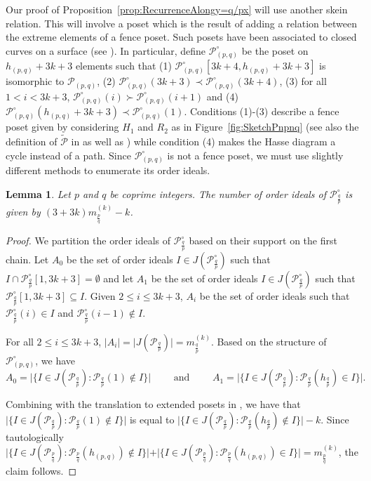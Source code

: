 \documentclass{article}
\newtheorem{lemma}[theorem]{Lemma}
\theoremstyle{remark}
\newcommand{\fqp}{\frac{q}{p}}
\newcommand{\calP}{\mathcal{P}}
\begin{document}
Our proof of Proposition~\ref{prop:RecurrenceAlongy=q/px} will use another skein relation. This will involve a poset which is the result of adding a relation between the extreme elements of a fence poset. Such posets have been associated to closed curves on a surface (see \cite[Theorem 5.7]{musiker2013bases}). In particular, define $\calP^\circ_{(p,q)}$ be the poset on $h_{(p,q)} + 3k + 3$ elements such that (1) $\calP^\circ_{(p,q)}[3k+4,h_{(p,q)}+3k+3]$ is isomorphic to $\calP_{(p,q)}$, (2) $\calP^\circ_{(p,q)}(3k+3) \prec \calP^\circ_{(p,q)}(3k+4)$, (3) for all $1 < i <  3k+3$, $\calP^\circ_{(p,q)}(i) \succ \calP^\circ_{(p,q)}(i+1)$ and (4) $\calP^\circ_{(p,q)}(h_{(p,q)}+3k+3) \prec \calP^\circ_{(p,q)}(1)$. Conditions (1)-(3) describe a fence poset given by considering $H_1$ and $R_2$ as in Figure~\ref{fig:SketchPnpnq} (see also the definition of $\widetilde{\calP}$ in \cite{BG} as well as \cite[Section 7]{ouguz2025oriented}) while condition (4) makes the Hasse diagram a cycle instead of a path. Since $\calP^\circ_{(p,q)}$ is not a fence poset, we must use slightly different methods to enumerate its order ideals. 

\begin{lemma}\label{lem:NumberOfOrderIdealsCircular}
Let $p$ and $q$ be coprime integers. The number of order ideals of $\calP^\circ_\fqp$ is given by $(3+3k)m_{\frac{p}{q}}^{(k)} - k$.
\end{lemma}

\begin{proof}
We partition the order ideals of $\calP^\circ_\fqp$ based on their support on the first chain.  Let $A_0$ be the set of order ideals $I \in J(\calP^\circ_\fqp)$ such that $I \cap\calP^\circ_\fqp[1, 3k + 3] = \emptyset$ and let $A_1$ be the set of order ideals $I \in J(\calP^\circ_\fqp)$ such that $\calP^\circ_\fqp[1, 3k + 3] \subseteq I$. Given $2 \leq i \leq 3k+3$, $A_i$ be the set of order ideals such that $\calP^\circ_\fqp(i) \in I$ and  $\calP^\circ_\fqp(i-1) \notin I$. 

For all $2 \leq i \leq 3k+3$, $\vert A_i \vert = \vert J(\calP_\fqp) \vert = m^{(k)}_{\frac{q}{p}}$. Based on the structure of $\calP^\circ_{(p,q)}$, we have \[
A_0 = \vert \{I \in J(\calP_\fqp): \calP_{\frac{q}{p}}(1) \notin I\}\vert \qquad \text{ and } \qquad A_1 =  \vert \{I \in J(\calP_{\frac{q}{p}}): \calP_{\frac{q}{p}}(h_\fqp) \in I\}\vert.
\]

Combining \cite[Lemma 8.25]{BG} with the translation to extended posets in \cite[Lemma 33]{banaian2025}, we have that $\vert \{I \in J(\calP_{\frac{q}{p}}): \calP_{\frac{q}{p}}(1) \notin I\}\vert$ is equal to $\vert \{I \in J(\calP_{\frac{q}{p}}):  \calP_{\frac{q}{p}}(h_\fqp) \notin I\}\vert - k$. Since tautologically $\vert \{I \in J(\calP_{\frac{p}{q}}):  \calP_{\frac{p}{q}}(h_{(p,q)}) \notin I\}\vert + \vert \{I \in J(\calP_{\frac{p}{q}}):  \calP_{\frac{p}{q}}(h_{(p,q)}) \in I\}\vert = m_{\frac{p}{q}}^{(k)}$, the claim follows. 
\end{proof}
\end{document}
